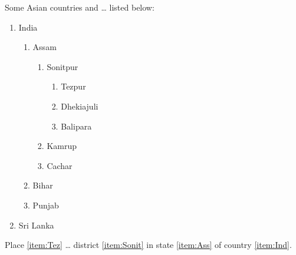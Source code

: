 \documentclass[11pt,a4paper]{article}
\begin{document}
Some Asian countries and … listed below:
    \begin{enumerate}
    \item India\label{item:Ind}
        \begin{enumerate}
            \item Assam\label{item:Ass}
            \begin{enumerate}
                \item Sonitpur\label{item:Sonit}
                \begin{enumerate}
                    \item Tezpur\label{item:Tez}
                    \item Dhekiajuli
                    \item Balipara
                \end{enumerate}
                \item Kamrup
                \item Cachar
            \end{enumerate}
            \item Bihar
            \item Punjab
        \end{enumerate}
        \item Sri Lanka
    \end{enumerate}
    Place \ref{item:Tez} … district \ref{item:Sonit} in
    state \ref{item:Ass} of country \ref{item:Ind}.
\end{document}
